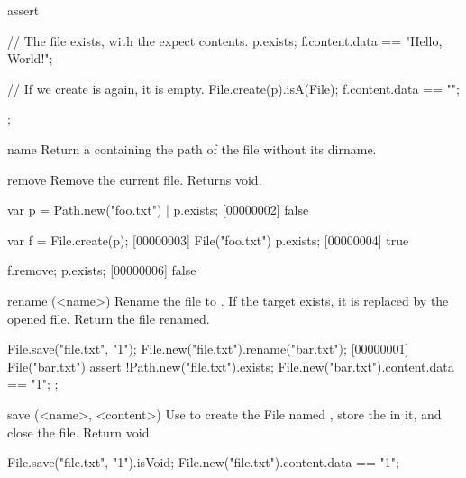 \begin{urbiscriptapi}
\begin{urbiscript}
assert
{
  // The file exists, with the expect contents.
  p.exists;
  f.content.data == "Hello, World!";

  // If we create is again, it is empty.
  File.create(p).isA(File);
  f.content.data == "";
};
\end{urbiscript}

\item[name]
  Return a  containing the path of the file without
  its dirname.

\item[remove]
  Remove the current file.  Returns void.
\begin{urbiscript}[firstnumber=1]
var p = Path.new("foo.txt") |
p.exists;
[00000002] false

var f = File.create(p);
[00000003] File("foo.txt")
p.exists;
[00000004] true

f.remove;
p.exists;
[00000006] false
\end{urbiscript}

\item[rename](<name>)%
  Rename the file to .  If the target exists, it is replaced by
  the opened file. Return the file renamed.
\begin{urbiscript}
File.save("file.txt", "1\n");
File.new("file.txt").rename("bar.txt");
[00000001] File("bar.txt")
assert
{
  !Path.new("file.txt").exists;
  File.new("bar.txt").content.data == "1\n";
};
\end{urbiscript}

\item[save](<name>, <content>)
  Use  to create the File named , store the
   in it, and close the file.  Return void.
\begin{urbiassert}
File.save("file.txt", "1\n").isVoid;
File.new("file.txt").content.data == "1\n";
\end{urbiassert}

\end{urbiscriptapi}


